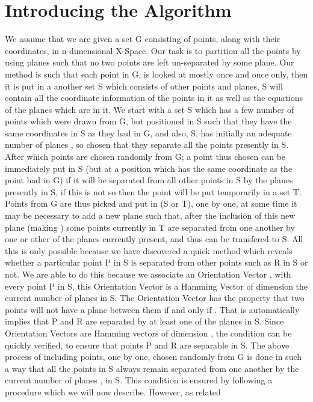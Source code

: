 \documentclass[english]{article}
\begin{document}
\section{Introducing the Algorithm}
We assume that we are given a set G consisting of  points, along with 
their coordinates, in n-dimensional X-Space. Our task is to partition all the 
points by using planes such that no two points are left un-separated
by some plane. Our method is such that each point in G, is looked
at mostly once and once only, then it is put in a another set S which
consists of other points and planes, S will contain all the coordinate
information of the points in it as well as the equations of the planes
which are in it. We start with a set S which has a few number of points
 which were drawn from G, but positioned in S such that they have the same coordinates in S as they had in G, and also, S, has initially an adequate
number of planes , so chosen that they separate all the
points  presently in S. After which points are chosen randomly
from G; a point thus chosen can be immediately put in S (but at a position which has the same coordinate as the point had in G) if it will
be separated from all other points in S by the planes presently in
S, if this is not so then the point will be put temporarily in a set
T. Points from G are thus picked and put in (S or T), one by one,
at some time it may be necessary to add a new plane such that, after
the inclusion of this new plane (making ) some  points
currently in T are separated from one another by one or other of the
 planes currently present, and thus can be transfered to S.
All this is only possible because we have discovered a quick method
which reveals whether a particular point P in S is separated from
other points such as R in S or not. We are able to do this because
we associate an \textquotedbl{}Orientation Vector\textquotedbl{} ,
with every point P in S, this Orientation Vector is a Hamming Vector
of dimension  the current number of planes in S. The Orientation
Vector has the property that two points will not have a plane between
them if and only if . That is  automatically
implies that P and R are separated by at least one of the  planes
in S. Since Orientation Vectors are Hamming vectors of dimension ,
the condition  can be quickly verified, to ensure
that points P and R are separable in S. The above process of including
points, one by one, chosen randomly from G is done in such a way that
all the points in S always remain separated from one another by the
current number of planes , in S. This condition is ensured by
following a procedure which we will now describe. However, as related
\end{document}
